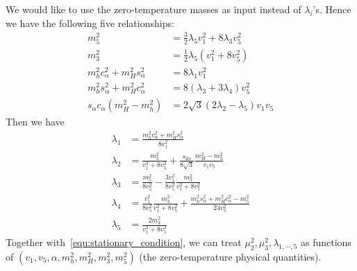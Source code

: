 \documentclass[12pt]{article}
\begin{document}
We would like to use the zero-temperature masses as input instead of $\lambda_i$'s. Hence we have the following five relationships:
\begin{subequations}
    \label{equ:masses}
    \begin{align}
        m_5^2 &= \frac{3}{2}\lambda_5v_1^2 + 8\lambda_3 v_5^2\\
        m_3^2 &= \frac{1}{2}\lambda_5(v_1^2 + 8v_5^2) \\
        m_h^2c_\alpha^2 + m_H^2 s_\alpha^2 &= 8\lambda_1v_1^2 \\
        m_h^2s_\alpha^2 + m_H^2 c_\alpha^2 &= 8(\lambda_3+3\lambda_4)v_5^2\\
        s_\alpha c_\alpha (m_H^2 - m_h^2) &= 2\sqrt{3}(2\lambda_2-\lambda_5)v_1 v_5
    \end{align}
\end{subequations}
Then we have
\begin{subequations}
    \begin{align}
        \lambda_1 &= \frac{m_h^2 c_\alpha^2 + m_H^2 s_\alpha^2}{8v_1^2}\\
        \lambda_2 &= \frac{m_3^2}{v_1^2 + 8 v_5^2} + \frac{s_{2\alpha}}{8\sqrt{3}}\frac{m_H^2-m_h^2}{v_1v_5}\\
        \lambda_3 &= \frac{m_5^2}{8v_5^2} - \frac{3v_1^2}{8v_5^2}\frac{m_3^2}{v_1^2+8v_5^2}\\
        \lambda_4 &= \frac{v_1^2}{8v_5^2}\frac{m_3^2}{v_1^2+8v_5^2}+\frac{m_h^2s_\alpha^2+m_H^2c_\alpha^2-m_5^2}{24v_5^2}\\
        \lambda_5 &= \frac{2m_3^2}{v_1^2+8v_5^2}
    \end{align}
\end{subequations}
Together with~\autoref{equ:stationary_condition}, we can treat $\mu_2^2,\mu_3^2,\lambda_{1,\cdots,5}$ as functions of $(v_1,v_5,\alpha,m_h^2,m_H^2,m_3^2,m_5^2)$ (the zero-temperature physical quantities).
\end{document}
